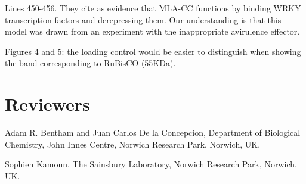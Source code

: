 \documentclass[10pt]{article}
\let\cite\citep
\providecommand\citep{\cite}
\begin{document}
\par\null

Lines 450-456. They cite \cite{Shen2007} as evidence that MLA-CC
functions by binding WRKY transcription factors and derepressing them.
Our understanding is that this model was drawn from an experiment with
the inappropriate avirulence effector.

\par\null

Figures 4 and 5: the loading control would be easier to distinguish when
showing the band corresponding to RuBisCO (55KDa).~\(\)

\par\null

\section*{Reviewers}

{\label{924286}}\par\null

Adam R. Bentham and Juan Carlos De la Concepcion, Department of
Biological Chemistry, John Innes Centre, Norwich Research Park, Norwich,
UK.

\par\null

Sophien Kamoun. The Sainsbury Laboratory, Norwich Research Park,
Norwich, UK.

\par\null

\FloatBarrier


\end{document}
